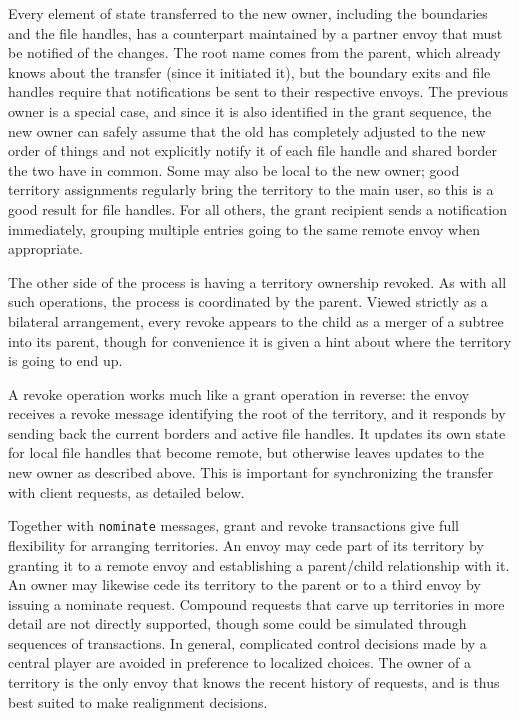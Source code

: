 Every element of state transferred to the new owner, including the boundaries and the file handles, has a counterpart maintained by a partner envoy that must be notified of the changes. The root name comes from the parent, which already knows about the transfer (since it initiated it), but the boundary exits and file handles require that notifications be sent to their respective envoys. The previous owner is a special case, and since it is also identified in the grant sequence, the new owner can safely assume that the old has completely adjusted to the new order of things and not explicitly notify it of each file handle and shared border the two have in common. Some may also be local to the new owner; good territory assignments regularly bring the territory to the main user, so this is a good result for file handles. For all others, the grant recipient sends a notification immediately, grouping multiple entries going to the same remote envoy when appropriate.

The other side of the process is having a territory ownership revoked. As with all such operations, the process is coordinated by the parent. Viewed strictly as a bilateral arrangement, every revoke appears to the child as a merger of a subtree into its parent, though for convenience it is given a hint about where the territory is going to end up.

A revoke operation works much like a grant operation in reverse: the envoy receives a revoke message identifying the root of the territory, and it responds by sending back the current borders and active file handles. It updates its own state for local file handles that become remote, but otherwise leaves updates to the new owner as described above. This is important for synchronizing the transfer with client requests, as detailed below.

Together with \texttt{nominate} messages, grant and revoke transactions give full flexibility for arranging territories. An envoy may cede part of its territory by granting it to a remote envoy and establishing a parent/child relationship with it. An owner may likewise cede its territory to the parent or to a third envoy by issuing a nominate request. Compound requests that carve up territories in more detail are not directly supported, though some could be simulated through sequences of transactions. In general, complicated control decisions made by a central player are avoided in preference to localized choices. The owner of a territory is the only envoy that knows the recent history of requests, and is thus best suited to make realignment decisions.

